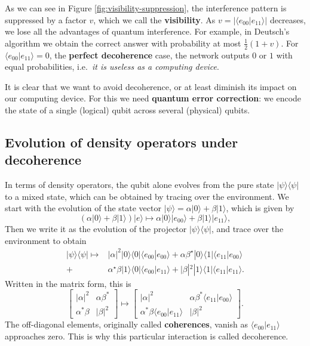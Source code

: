 \documentclass[fleqn]{article}
\newenvironment{idea}{\noindent}{\medskip}
\begin{document}
As we can see in Figure \ref{fig:visibility-suppression}, the interference pattern is suppressed by a factor \(v\), which we call the \textbf{visibility}.
As \(v=|\langle e_{00}|e_{11}\rangle|\) decreases, we lose all the advantages of quantum interference.
For example, in Deutsch's algorithm we obtain the correct answer with probability at most \(\frac12(1+v)\).
For \(\langle e_{00}|e_{11}\rangle = 0\), the \textbf{perfect decoherence} case, the network outputs \(0\) or \(1\) with equal probabilities, i.e.~\emph{it is useless as a computing device}.

\begin{idea}

It is clear that we want to avoid decoherence, or at least diminish its impact on our computing device.
For this we need \textbf{quantum error correction}: we encode the state of a single (logical) qubit across several (physical) qubits.

\end{idea}

\hypertarget{evolution-of-density-operators-under-decoherence}{%
\subsection{Evolution of density operators under decoherence}\label{evolution-of-density-operators-under-decoherence}}

In terms of density operators, the qubit alone evolves from the pure state \(|\psi\rangle\langle\psi|\) to a mixed state, which can be obtained by tracing over the environment.
We start with the evolution of the state vector \(|\psi\rangle=\alpha|0\rangle+\beta|1\rangle\), which is given by
\[
  \left( \alpha|0\rangle +\beta |1\rangle\right)|e\rangle \longmapsto
  \alpha |0\rangle|e_{00}\rangle +\beta |1\rangle |e_{11}\rangle,
\]
Then we write it as the evolution of the projector \(|\psi\rangle\langle\psi|\), and trace over the environment to obtain
\[
  \begin{aligned}
    |\psi\rangle\langle\psi| \longmapsto & |\alpha|^2|0\rangle\langle 0| \langle e_{00}|e_{00}\rangle+ \alpha\beta^\star |0\rangle\langle 1|\langle e_{11}|e_{00}\rangle
  \\+ &\alpha^\star\beta |1\rangle\langle 0|\langle e_{00}|e_{11}\rangle  + |\beta|^2|1\rangle\langle 1|\langle e_{11}|e_{11}\rangle.
  \end{aligned}
\]
Written in the matrix form, this is
\[
  \begin{bmatrix}
    |\alpha|^2 & \alpha\beta^\ast
  \\\alpha^\ast\beta & |\beta|^2
  \end{bmatrix}
  \longmapsto
  \begin{bmatrix}
    |\alpha|^2 & \alpha\beta^\ast \langle e_{11}|e_{00}\rangle
    \\\alpha^\ast\beta \langle e_{00}|e_{11}\rangle & |\beta|^2
  \end{bmatrix}.
\]
The off-diagonal elements, originally called \textbf{coherences}, vanish as \(\langle e_{00}|e_{11}\rangle\) approaches zero.
This is why this particular interaction is called decoherence.
\end{document}
